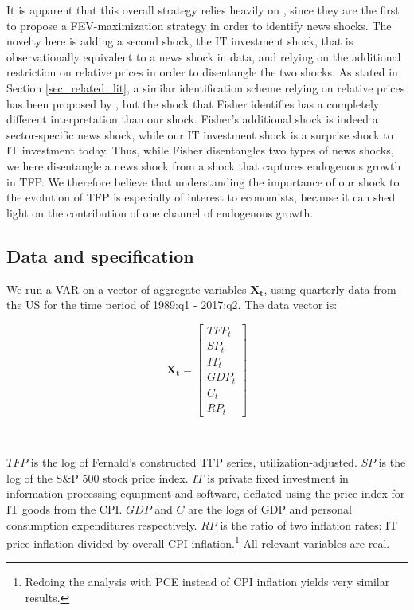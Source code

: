 \documentclass[11pt]{article}
\renewcommand{\[}{\begin{equation}}
\renewcommand{\]}{\end{equation}}
\begin{document}
It is apparent that this overall strategy relies heavily on \cite{barsky_sims2011}, since they are the first to propose a FEV-maximization strategy in order to identify news shocks. The novelty here is adding a second shock, the IT investment shock, that is observationally equivalent to a news shock in data, and relying on the additional restriction on relative prices in order to disentangle the two shocks. As stated in Section \ref{sec_related_lit}, a similar identification scheme relying on relative prices has been proposed by \cite{fisher2006}, but the shock that Fisher identifies has a completely different interpretation than our shock. Fisher's additional shock is indeed a sector-specific news shock, while our IT investment shock is a surprise shock to IT investment today. Thus, while Fisher disentangles two types of news shocks, we here disentangle a news shock from a shock that captures endogenous growth in TFP. We therefore believe that understanding the importance of our shock to the evolution of TFP is especially of interest to economists, because it can shed light on the contribution of one channel of endogenous growth. 

\subsection{Data and specification}
We run a VAR on a vector of aggregate variables $\mathbf{X_t}$, using quarterly data from the US for the time period of 1989:q1 - 2017:q2. The data vector is:

	\begin{equation*}
	\mathbf{X_t} = 
	\begin{bmatrix}
    TFP_t      \\
 
   SP_t   \\
   
   IT_t \\
   
   GDP_t \\
   
   C_t \\
   
   RP_t
\end{bmatrix}
	\end{equation*}
	
	\
	
	
$TFP$ is the log of Fernald's constructed TFP series, utilization-adjusted. $SP$ is the log of the S\&P 500 stock price index. $IT$ is private fixed investment in information processing equipment and software, deflated using the price index for IT goods from the CPI. $GDP$ and $C$ are the logs of GDP and personal consumption expenditures respectively. $RP$ is the ratio of two inflation rates: IT price inflation divided by overall CPI inflation.\footnote{Redoing the analysis with PCE instead of CPI inflation yields very similar results.} All relevant variables are real. 
\end{document}

